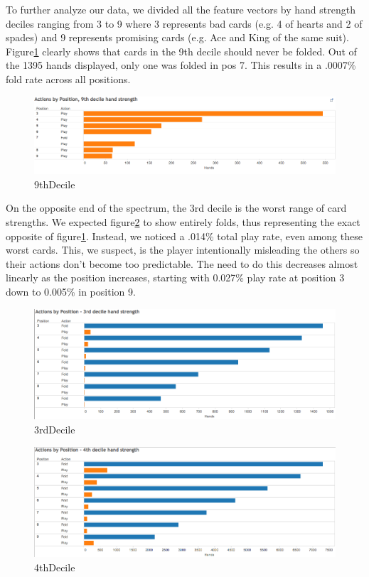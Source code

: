 \documentclass[twoside]{article}
\begin{document}
\begin{multicols}{2}
To further analyze our data, we divided all the feature vectors by hand strength deciles ranging from 3 to 9 where 3 represents bad cards (e.g. 4 of hearts and 2 of spades) and 9 represents promising cards (e.g. Ace and King of the same suit). Figure\ref{fig:9thDecile} clearly shows that cards in the 9th decile should never be folded. Out of the 1395 hands displayed, only one was folded in pos 7. This results in a .0007\% fold rate across all positions. 

\begin{figure}[H]
  \centering
  \centerline{\includegraphics[width=1\columnwidth]{9thDecile.png}}
   \caption{9thDecile}
  \label{fig:9thDecile}
\end{figure}

On the opposite end of the spectrum, the 3rd decile is the worst range of card strengths. We expected figure\ref{fig:3rdDecile} to show entirely folds, thus representing the exact opposite of figure\ref{fig:9thDecile}. Instead, we noticed a .014\% total play rate, even among these worst cards. This, we suspect, is the player intentionally misleading the others so their actions don't become too predictable. The need to do this decreases almost linearly as the position increases, starting with 0.027\% play rate at position 3 down to 0.005\% in position 9. 

\begin{figure}[H]
  \centering
  \centerline{\includegraphics[width=1\columnwidth]{3rdDecile.png}}
   \caption{3rdDecile}
  \label{fig:3rdDecile}
\end{figure}

\begin{figure}[H]
  \centering
  \centerline{\includegraphics[width=1\columnwidth]{4thDecile.png}}
   \caption{4thDecile}
  \label{fig:4thDecile}
\end{figure}


\end{multicols}
\end{document}
